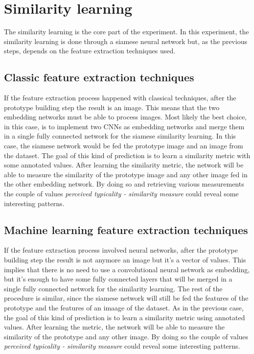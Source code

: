 \documentclass[conference]{IEEEtran}
\begin{document}
	\section{Similarity learning}
	
		\noindent The similarity learning is the core part of the experiment. In this experiment, the similarity learning is done through a siamese neural network but, as the previous steps, depends on the 
		feature extraction techniques used. 
		
		\subsection{Classic feature extraction techniques}
		
			\noindent If the feature extraction process happened with classical techniques, after the prototype building step the result is an image. This means that the two embedding networks must be able to process 
			images. Most likely the best choice, in this case, is to implement two CNNs as embedding networks and merge them in a single fully connected network for the siamese similarity learning. 
			In this case, the siamese network would be fed the prototype image and an image from the dataset. The goal of this kind of prediction is to learn a similarity metric with some annotated values. 
			After learning the similarity metric, the network will be able to measure the similarity of the prototype image and any other image fed in the other embedding network. By doing so and retrieving various 
			measurements the couple of values \textit{perceived typicality - similarity measure} could reveal some interesting patterns.
		
		\subsection{Machine learning feature extraction techniques}
		
			\noindent If the feature extraction process involved neural networks, after the prototype building step the result is not anymore an image but it's a vector of values. This implies that there is no need to 
			use a convolutional neural network as embedding, but it's enough to have some fully connected layers that will be merged in a single fully connected network for the similarity learning. The rest of the procedure 
			is similar, since the siamese network will still be fed the features of the prototype and the features of an imaage of the dataset. As in the previous case, the goal of this kind of prediction is to learn 
			a similarity metric using annotated values. After learning the metric, the network will be able to measure the similarity of the prototype and any other image. 
			By doing so the couple of values \textit{perceived typicality - similarity measure} could reveal some interesting patterns.
		
\end{document}
